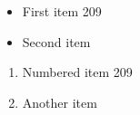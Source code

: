 \documentclass{article}
\begin{document}
\begin{itemize}
\item First item 209
\item Second item
\end{itemize}
\begin{enumerate}
\item Numbered item 209
\item Another item
\end{enumerate}
\end{document}
